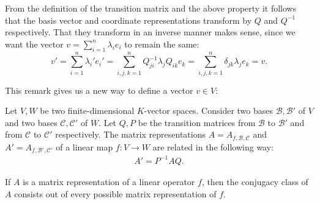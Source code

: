     \begin{remark}
        From the definition of the transition matrix and the above property it follows that the basis vector and coordinate representations transform by $Q$ and $Q^{-1}$ respectively. That they transform in an inverse manner makes sense, since we want the vector $v=\sum_{i=1}^n\lambda_ie_i$ to remain the same: \[v'=\sum_{i=1}^n\lambda_i'e_i'=\sum_{i,j,k=1}^nQ^{-1}_{ji}\lambda_jQ_{ik}e_k = \sum_{i,j,k=1}^n\delta_{jk}\lambda_je_k = v.\]
    \end{remark}
    This remark gives us a new way to define a vector $v\in V$:

    \begin{property}\label{linalgebra:theorem:transition_matrix_representation}
        Let $V,W$ be two finite-dimensional $K$-vector spaces. Consider two bases $\mathcal{B},\mathcal{B}'$ of $V$ and two bases $\mathcal{C},\mathcal{C}'$ of $W$. Let $Q,P$ be the transition matrices from $\mathcal{B}$ to $\mathcal{B}'$ and from $\mathcal{C}$ to $\mathcal{C}'$ respectively. The matrix representations $A=A_{f,\mathcal{B},\mathcal{C}}$ and $A' = A_{f,\mathcal{B}',\mathcal{C}'}$ of a linear map $f:V\rightarrow W$ are related in the following way:
        \begin{gather}
            A' = P^{-1}AQ.
        \end{gather}
    \end{property}

    \begin{remark}
        If $A$ is a matrix representation of a linear operator $f$, then the conjugacy class of $A$ consists out of every possible matrix representation of $f$.
    \end{remark}

